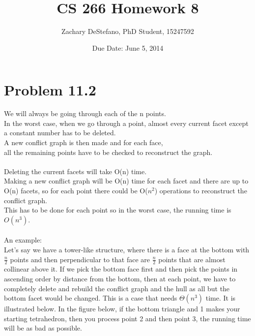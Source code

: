 \documentclass[11pt,psfig]{article}
\begin{document}
\setlength{\parskip}{1.2ex plus0.3ex minus 0.3ex}


\thispagestyle{empty} \pagestyle{myheadings} 



\title{CS 266 Homework 8}
\author{Zachary DeStefano, PhD Student, 15247592}
\date{Due Date: June 5, 2014}

\maketitle

\vfill\eject

\section*{Problem 11.2}

We will always be going through each of the n points. \\
In the worst case, when we go through a point, almost every current facet except a constant number has to be deleted.\\
A new conflict graph is then made and for each face, \\
all the remaining points have to be checked to reconstruct the graph. \\
\\
Deleting the current facets will take O(n) time. \\
Making a new conflict graph will be O(n) time for each facet and there are up to O(n) facets, so for each point there could be O($n^2$) operations to reconstruct the conflict graph. \\
This has to be done for each point so in the worst case, the running time is $O(n^3)$. \\
\\
An example:\\
Let's say we have a tower-like structure, where there is a face at the bottom with $\frac{n}{2}$ points and then perpendicular to that face are $\frac{n}{2}$ points that are almost collinear above it. If we pick the bottom face first and then pick the points in ascending order by distance from the bottom, then at each point, we have to completely delete and rebuild the conflict graph and the hull as all but the bottom facet would be changed. This is a case that needs $\Theta(n^3)$ time. It is illustrated below. In the figure below, if the bottom triangle and 1 makes your starting tetrahedron, then you process point 2 and then point 3, the running time will be as bad as possible. 
\end{document}
